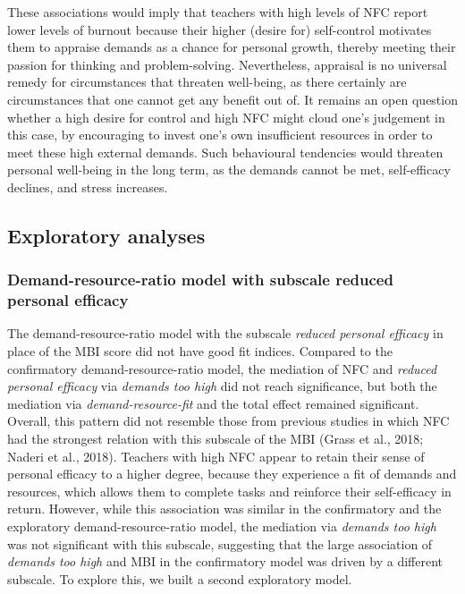 \documentclass[
  english,
  man,floatsintext]{apa6}
\begin{document}
These associations would imply that teachers with high levels of NFC report lower levels of burnout because their higher (desire for) self-control motivates them to appraise demands as a chance for personal growth, thereby meeting their passion for thinking and problem-solving.
Nevertheless, appraisal is no universal remedy for circumstances that threaten well-being, as there certainly are circumstances that one cannot get any benefit out of.
It remains an open question whether a high desire for control and high NFC might cloud one's judgement in this case, by encouraging to invest one's own insufficient resources in order to meet these high external demands.
Such behavioural tendencies would threaten personal well-being in the long term, as the demands cannot be met, self-efficacy declines, and stress increases.

\hypertarget{exploratory-analyses-2}{%
\subsection{Exploratory analyses}\label{exploratory-analyses-2}}

\hypertarget{demand-resource-ratio-model-with-subscale-reduced-personal-efficacy}{%
\subsubsection{Demand-resource-ratio model with subscale reduced personal efficacy}\label{demand-resource-ratio-model-with-subscale-reduced-personal-efficacy}}

The demand-resource-ratio model with the subscale \emph{reduced personal efficacy} in place of the MBI score did not have good fit indices.
Compared to the confirmatory demand-resource-ratio model, the mediation of NFC and \emph{reduced personal efficacy} via \emph{demands too high} did not reach significance, but both the mediation via \emph{demand-resource-fit} and the total effect remained significant.
Overall, this pattern did not resemble those from previous studies in which NFC had the strongest relation with this subscale of the MBI (Grass et al., 2018; Naderi et al., 2018).
Teachers with high NFC appear to retain their sense of personal efficacy to a higher degree, because they experience a fit of demands and resources, which allows them to complete tasks and reinforce their self-efficacy in return.
However, while this association was similar in the confirmatory and the exploratory demand-resource-ratio model, the mediation via \emph{demands too high} was not significant with this subscale, suggesting that the large association of \emph{demands too high} and MBI in the confirmatory model was driven by a different subscale.
To explore this, we built a second exploratory model.
\end{document}
